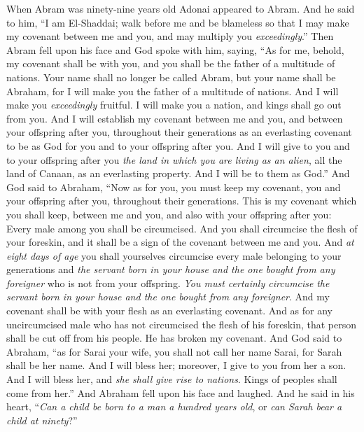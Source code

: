 \begin{biblechapter} %
 When Abram was ninety-nine years old Adonai appeared to Abram. And he said to him, “I am El-Shaddai; walk before me and be blameless
\verse so that I may make my covenant between me and you, and may multiply you \textit{exceedingly}.”
\verse Then Abram fell upon his face and God spoke with him, saying,
\verse “As for me, behold, my covenant shall be with you, and you shall be the father of a multitude of nations.
\verse Your name shall no longer be called Abram, but your name shall be Abraham, for I will make you the father of a multitude of nations.
\verse And I will make you \textit{exceedingly} fruitful. I will make you a nation, and kings shall go out from you.
\verse And I will establish my covenant between me and you, and between your offspring after you, throughout their generations as an everlasting covenant to be as God for you and to your offspring after you.
\verse And I will give to you and to your offspring after you \textit{the land in which you are living as an alien}, all the land of Canaan, as an everlasting property. And I will be to them as God.”
\verse And God said to Abraham, “Now as for you, you must keep my covenant, you and your offspring after you, throughout their generations.
\verse This is my covenant which you shall keep, between me and you, and also with your offspring after you: Every male among you shall be circumcised.
\verse And you shall circumcise the flesh of your foreskin, and it shall be a sign of the covenant between me and you.
\verse And \textit{at eight days of age} you shall yourselves circumcise every male belonging to your generations and \textit{the servant born in your house and the one bought from any foreigner} who is not from your offspring.
\verse \textit{You must certainly circumcise} \textit{the servant born in your house and the one bought from any foreigner}. And my covenant shall be with your flesh as an everlasting covenant.
\verse And as for any uncircumcised male who has not circumcised the flesh of his foreskin, that person shall be cut off from his people. He has broken my covenant.
\verse And God said to Abraham, “as for Sarai your wife, you shall not call her name Sarai, for Sarah shall be her name.
\verse And I will bless her; moreover, I give to you from her a son. And I will bless her, and \textit{she shall give rise to nations}. Kings of peoples shall come from her.”
\verse And Abraham fell upon his face and laughed. And he said in his heart, “\textit{Can a child be born to a man a hundred years old}, or \textit{can Sarah bear a child at ninety}?”

\end{biblechapter}
